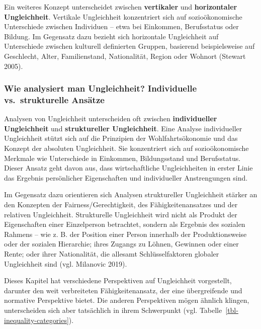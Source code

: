 \documentclass[
  nswissgerman,
  a4paper,
  DIV=11,
  numbers=noendperiod,
  oneside,
  openany]{scrreprt}
\begin{document}
Ein weiteres Konzept unterscheidet zwischen \textbf{vertikaler} und
\textbf{horizontaler Ungleichheit}. Vertikale Ungleichheit konzentriert
sich auf sozioökonomische Unterschiede zwischen Individuen -- etwa bei
Einkommen, Berufsstatus oder Bildung. Im Gegensatz dazu bezieht sich
horizontale Ungleichheit auf Unterschiede zwischen kulturell definierten
Gruppen, basierend beispielsweise auf Geschlecht, Alter, Familienstand,
Nationalität, Region oder Wohnort (Stewart 2005).

\subsubsection{Wie analysiert man Ungleichheit? Individuelle
vs.~strukturelle
Ansätze}\label{wie-analysiert-man-ungleichheit-individuelle-vs.-strukturelle-ansuxe4tze}

Analysen von Ungleichheit unterscheiden oft zwischen
\textbf{individueller Ungleichheit} und \textbf{struktureller
Ungleichheit}. Eine Analyse individueller Ungleichheit stützt sich auf
die Prinzipien der Wohlfahrtsökonomie und das Konzept der absoluten
Ungleichheit. Sie konzentriert sich auf sozioökonomische Merkmale wie
Unterschiede in Einkommen, Bildungsstand und Berufsstatus. Dieser Ansatz
geht davon aus, dass wirtschaftliche Ungleichheiten in erster Linie das
Ergebnis persönlicher Eigenschaften und individueller Anstrengungen
sind.

Im Gegensatz dazu orientieren sich Analysen struktureller Ungleichheit
stärker an den Konzepten der Fairness/Gerechtigkeit, des
Fähigkeitenansatzes und der relativen Ungleichheit. Strukturelle
Ungleichheit wird nicht als Produkt der Eigenschaften einer Einzelperson
betrachtet, sondern als Ergebnis des sozialen Rahmens -- wie z. B. der
Position einer Person innerhalb der Produktionsweise oder der sozialen
Hierarchie; ihres Zugangs zu Löhnen, Gewinnen oder einer Rente; oder
ihrer Nationalität, die allesamt Schlüsselfaktoren globaler Ungleichheit
sind (vgl. Milanovic 2019).

Dieses Kapitel hat verschiedene Perspektiven auf Ungleichheit
vorgestellt, darunter den weit verbreiteten Fähigkeitenansatz, der eine
übergreifende und normative Perspektive bietet. Die anderen Perspektiven
mögen ähnlich klingen, unterscheiden sich aber tatsächlich in ihrem
Schwerpunkt (vgl. Tabelle~\ref{tbl-inequality-categories}).

\begingroup\fontsize{8}{10}\selectfont
\end{document}
